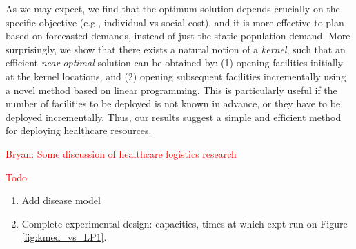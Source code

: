 As we may expect, we find that the optimum solution depends crucially on the specific objective
(e.g., individual vs social cost), and it is more effective to plan based on forecasted demands,
instead of just the static population demand. More surprisingly, we show that
there exists a natural notion of a \emph{kernel}, such that an efficient 
\emph{near-optimal} solution can be obtained by:
(1) opening facilities initially at the kernel locations, and
(2) opening subsequent facilities incrementally using a novel method based on linear programming.
This is particularly useful if the number of facilities to
be deployed is not known in advance, or they have to be deployed incrementally.
Thus, our results suggest a simple and efficient method for deploying healthcare resources.

\textcolor{red}{Bryan: Some discussion of healthcare logistics research}


\textcolor{red}{Todo}
\begin{enumerate}
\item
Add disease model
\item
Complete experimental design: capacities, times at which expt run
on Figure \ref{fig:kmed_vs_LP1}.
\end{enumerate}
